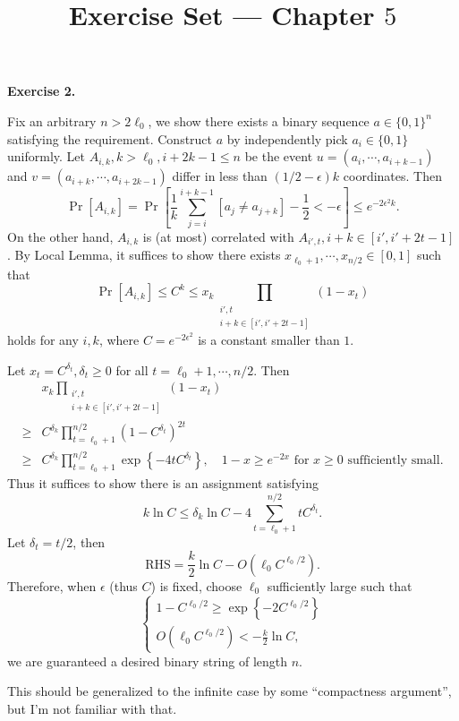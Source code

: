 \documentclass[a4paper]{article}
\title{Exercise Set --- Chapter $5$}
\date{}
\newenvironment{exercise}[1]{
	\par
	\noindent\textbf{Exercise #1.}\quad
}{
	\par
	\bigskip
}
\newcommand{\pbra}[1]{\left( #1 \right)}
\newcommand{\cbra}[1]{\left\{ #1 \right\}}
\newcommand{\sbra}[1]{\left[ #1 \right]}
\newcommand{\bin}{\{0,1\}}
\begin{document}
\maketitle

\begin{exercise}{2}
    Fix an arbitrary $n>2\ell_0$, we show there exists a binary sequence $a\in\bin^n$ satisfying the requirement.
    Construct $a$ by independently pick $a_i\in\bin$ uniformly.
    Let $A_{i,k},k>\ell_0,i+2k-1\leq n$ be the event $u=(a_i,\cdots,a_{i+k-1})$ and $v=(a_{i+k},\cdots,a_{i+2k-1})$
    differ in less than $(1/2-\epsilon)k$ coordinates.
    Then
    $$
    \Pr\sbra{A_{i,k}}=\Pr\sbra{\frac1k\sum_{j=i}^{i+k-1}[a_j\neq a_{j+k}]-\frac12<-\epsilon}
    \leq e^{-2\epsilon^2k}.
    $$
    On the other hand, $A_{i,k}$ is (at most) correlated with $A_{i',t},i+k\in[i',i'+2t-1]$.
    By Local Lemma, it suffices to show there exists $x_{\ell_0+1},\cdots,x_{n/2}\in[0,1]$ such that
    $$
    \Pr\sbra{A_{i,k}}\leq C^k\leq x_k\prod_{\substack{i',t\\i+k\in[i',i'+2t-1]}}(1-x_t)
    $$
    holds for any $i,k$, where $C=e^{-2\epsilon^2}$ is a constant smaller than $1$.

    Let $x_t=C^{\delta_t},\delta_t\geq0$ for all $t=\ell_0+1,\cdots,n/2$.
    Then
    \begin{align*}
        &x_k\prod_{\substack{i',t\\i+k\in[i',i'+2t-1]}}(1-x_t)\\
        \geq&C^{\delta_k}\prod_{t=\ell_0+1}^{n/2}\pbra{1-C^{\delta_t}}^{2t}\\
        \geq&C^{\delta_k}\prod_{t=\ell_0+1}^{n/2}\exp\cbra{-4tC^{\delta_t}},\quad 1-x\geq e^{-2x}
        \text{ for $x\geq0$ sufficiently small.}
    \end{align*}
    Thus it suffices to show there is an assignment satisfying
    $$
        k\ln C\leq\delta_k\ln C-4\sum_{t=\ell_0+1}^{n/2}tC^{\delta_t}.
    $$
    Let $\delta_t=t/2$, then
    $$
    \text{RHS}=\frac k2\ln C-O(\ell_0C^{\ell_0/2}).
    $$
    Therefore, when $\epsilon$ (thus $C$) is fixed, choose $\ell_0$ sufficiently large such that
    $$
    \begin{cases}
        1-C^{\ell_0/2}\geq\exp\cbra{-2C^{\ell_0/2}}\\
        O(\ell_0C^{\ell_0/2})<-\frac k2\ln C,
    \end{cases}
    $$
    we are guaranteed a desired binary string of length $n$.

    This should be generalized to the infinite case by some ``compactness argument'', but I'm not familiar with that.
\end{exercise}
\end{document}
